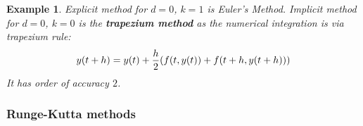 \documentclass[20pt]{article} %
\theoremstyle{break}
\newtheorem{exa}[definition]{Example}
\begin{document}
\begin{exa}Explicit method for $d=0$, $k=1$ is Euler's Method. Implicit method for $d=0$, $k=0$ is the {\bf trapezium method} as the numerical integration is via trapezium rule:
\[y(t+h)=y(t)+{h\over 2}(f(t, y(t))+f(t+h, y(t+h)))\] 
  It has order of accuracy $2$.\end{exa}

\newpage

\subsubsection{Runge-Kutta methods}



  
\end{document}
